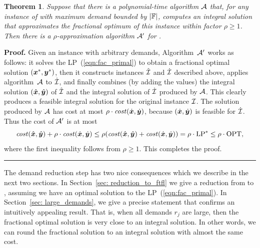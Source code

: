 \documentclass[oneside,final]{ucr}
\newtheorem{theorem}{Theorem}
\newenvironment{proof}[1][Proof]{\textbf{#1.} }{\ \rule{0.5em}{0.5em}}
\begin{document}

\begin{theorem}\label{thm: reduction to polynomial}
  Suppose that there is a polynomial-time algorithm $\calA$
  that, for any instance of {\FTFP} with maximum demand
  bounded by $|\mathbb{F}|$, computes an integral solution
  that approximates the fractional optimum of this instance
  within factor $\rho\geq 1$.  Then there is a
  $\rho$-approximation algorithm $\calA'$ for {\FTFP}.
\end{theorem}
\begin{proof}
  Given an {\FTFP} instance with arbitrary demands, Algorithm~$\calA'$ works
as follows: it solves the LP~(\ref{eqn:fac_primal}) to obtain a
  fractional optimal solution $(\boldsymbol{x}^\ast,\boldsymbol{y}^\ast)$, then it constructs
  instances $\hatcalI$ and $\dotcalI$ described above,  applies
  algorithm~$\calA$ to $\dotcalI$, and finally combines (by adding
  the values) the integral solution $(\hat{\boldsymbol{x}}, \hat{\boldsymbol{y}})$ of
  $\hatcalI$ and the integral solution of $\dotcalI$ produced
  by $\calA$. This clearly produces a feasible integral
  solution for the original instance $\mathcal{I}$.
The solution produced by $\calA$ has cost at most
$\rho\cdot{\it cost}(\dot{\boldsymbol{x}},\dot{\boldsymbol{y}})$, because $(\dot{\boldsymbol{x}},\dot{\boldsymbol{y}})$
is feasible for $\dotcalI$. Thus the cost of $\calA'$ is at most
% 
\begin{equation*}
 {\it cost}(\hat{\boldsymbol{x}}, \hat{\boldsymbol{y}}) + \rho\cdot{\it cost}(\dot{\boldsymbol{x}},\dot{\boldsymbol{y}})
	\le
 \rho({\it cost}(\hat{\boldsymbol{x}}, \hat{\boldsymbol{y}}) + {\it cost}(\dot{\boldsymbol{x}},\dot{\boldsymbol{y}}))
		= \rho\cdot\mbox{\rm LP}^\ast \le \rho\cdot\mbox{\rm OPT},
\end{equation*}
%
where the first inequality follows from $\rho\geq 1$. This completes
the proof.
\end{proof}

The demand reduction step has two nice consequences which we
describe in the next two sections. In Section~\ref{sec:
  reduction_to_ftfl} we give a reduction from {\FTFP} to
{\FTFL}, assuming we have an optimal solution to the
LP~(\ref{eqn:fac_primal}). In Section~\ref{sec:
  large_demands}, we give a precise statement that confirms
an intuitively appealing result. That is, when all demands
$r_j$ are large, then the fractional optimal solution is
very close to an integral solution. In other words, we can
round the fractional solution to an integral solution with
almost the same cost.
\end{document}
